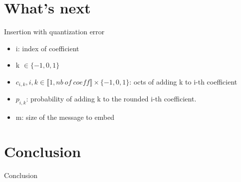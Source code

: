 \documentclass[11pt,compress]{beamer} %
\begin{document}
\section{What's next}
\begin{frame}{Insertion with quantization error}
  \begin{itemize}
    \item i: index of coefficient
    \item k $\in \{-1,0,1\}$
    \item $c_{i,k}, i, k \in \llbracket 1,nb\ of\ coeff \rrbracket \times \{-1,0,1\}$: octs of adding k to i-th coefficient
    \item $p_{i,k}$: probability of adding k to the rounded i-th coefficient.
    \item m: size of the message to embed
  \end{itemize}
\end{frame}

\section*{Conclusion}

\begin{frame}{Conclusion}

\end{frame}

\end{document}
